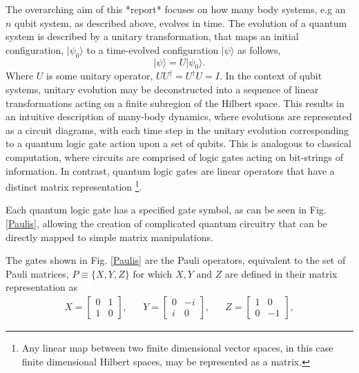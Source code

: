 The overarching aim of this *report* focuses on how many body systems, e.g an $n$ qubit system, as described above, 
evolves in time. The evolution of a quantum system is described by a unitary transformation, that maps an initial configuration, $|\psi_0\rangle $
to a time-evolved configuration $|\psi\rangle$ as follows, 
\begin{equation}
    |\psi \rangle = U |\psi_0\rangle. 
\end{equation}
Where $U$ is some unitary operator, $UU^{\dagger} = U^{\dagger}U = I$. 
In the context of qubit systems, unitary evolution may be deconstructed into a sequence of linear transformations acting on a finite subregion of the Hilbert space. 
This results in an intuitive description of many-body dynamics, where evolutions are represented as a circuit diagrams, 
with each time step in the unitary evolution corresponding to a quantum logic gate action upon a set of qubits.
This is analogous to classical computation, where circuits are comprised of logic gates acting on bit-strings of information. 
In contrast, quantum logic gates are linear operators that have a distinct matrix representation \footnote{Any linear map between two finite dimensional vector spaces, in this case finite dimensional Hilbert spaces, may be represented as a matrix. }.  

Each quantum logic gate has a specified gate symbol, as can be seen in Fig. \ref{Paulis}, allowing the creation of complicated quantum circuitry that can be directly
mapped to simple matrix manipulations.



The gates shown in Fig. \ref{Paulis} are  the Pauli operators, equivalent
to the set of Pauli matrices, $P \equiv \{X, Y, Z\}$ for which $X, Y \text{ and } Z$ are defined in their matrix representation as
\begin{align}
    \label{PauliMatrices}
    X = \begin{bmatrix}
            0 & 1 \\
            1 & 0
        \end{bmatrix},
     &  &
    Y = \begin{bmatrix}
            0  & -i \\
            i & 0
        \end{bmatrix},
     &  &
    Z = \begin{bmatrix}
            1 & 0  \\
            0 & -1
        \end{bmatrix},
\end{align}

